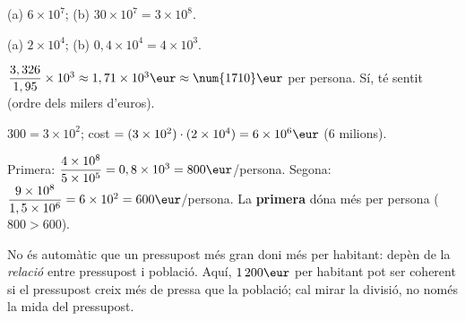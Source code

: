 \begin{solucions}
\begin{sollist}
  \item (a) $6\times 10^{7}$; \quad (b) $30\times 10^{7}=3\times 10^{8}$.
  \item (a) $2\times 10^{4}$; \quad (b) $0,4\times 10^{4}=4\times 10^{3}$.
  \item $\dfrac{3,326}{1,95}\times 10^{3}\approx 1,71\times 10^{3}\eur\approx\num{1710}\eur$
        per persona. Sí, té sentit (ordre dels milers d'euros).
  \item $300=3\times 10^{2}$; cost $=(3\times 10^{2})\cdot(2\times 10^{4})=6\times 10^{6}\eur$
        ($6$ milions).
  \item Primera: $\dfrac{4\times 10^{8}}{5\times 10^{5}}=0,8\times 10^{3}=800\eur$/persona.
        Segona: $\dfrac{9\times 10^{8}}{1,5\times 10^{6}}=6\times 10^{2}=600\eur$/persona.
        La \textbf{primera} dóna més per persona ($800>600$).
  \item No és automàtic que un pressupost més gran doni més per habitant: depèn de la
        \emph{relació} entre pressupost i població. Aquí, $1\,200\eur$ per habitant pot
        ser coherent si el pressupost creix més de pressa que la població; cal mirar la
        divisió, no només la mida del pressupost.
\end{sollist}
\end{solucions}
